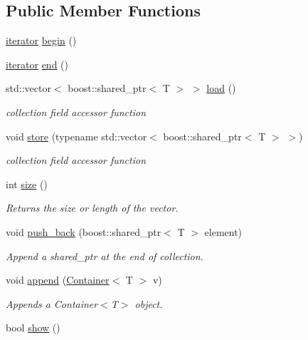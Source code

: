 \subsection*{Public Member Functions}
\begin{DoxyCompactItemize}
\item 
\hyperlink{class_container_afe880028d8304353129f47cd1d28c20a}{iterator} \hyperlink{class_container_a9ad6802d12bf5f48400bc346de37ad0f}{begin} ()
\item 
\hyperlink{class_container_afe880028d8304353129f47cd1d28c20a}{iterator} \hyperlink{class_container_a769250b7546b782007f1adaba8a07336}{end} ()
\item 
std::vector$<$ boost::shared\_\-ptr$<$ T $>$ $>$ \hyperlink{class_container_a9161a87726434f8955398137c647947c}{load} ()
\begin{DoxyCompactList}\small\item\em collection field accessor function \end{DoxyCompactList}\item 
void \hyperlink{class_container_aadc7faacbf43540e46144319f7369a3e}{store} (typename std::vector$<$ boost::shared\_\-ptr$<$ T $>$ $>$)
\begin{DoxyCompactList}\small\item\em collection field accessor function \end{DoxyCompactList}\item 
int \hyperlink{class_container_aef8dda28fbfe205ce25ae824d84bb1c9}{size} ()
\begin{DoxyCompactList}\small\item\em Returns the size or length of the vector. \end{DoxyCompactList}\item 
void \hyperlink{class_container_afd87c69cb799ed7b434c29090083a285}{push\_\-back} (boost::shared\_\-ptr$<$ T $>$ element)
\begin{DoxyCompactList}\small\item\em Append a shared\_\-ptr at the end of collection. \end{DoxyCompactList}\item 
void \hyperlink{class_container_ae763eb37b721d401327c97016fb2fa54}{append} (\hyperlink{class_container}{Container}$<$ T $>$ v)
\begin{DoxyCompactList}\small\item\em Appends a Container$<$T$>$ object. \end{DoxyCompactList}\item 
bool \hyperlink{class_container_ad72379ee222b073a5eecec7fc1bedfc2}{show} ()

\end{DoxyCompactItemize}
